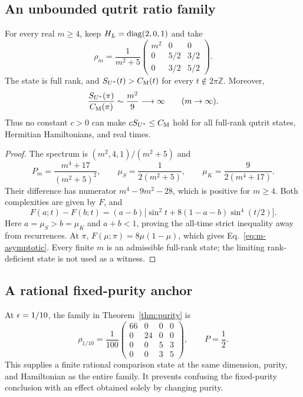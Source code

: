 \subsection{An unbounded qutrit ratio family}\label{app:unbounded-left}
\begin{proposition}\label{prop:unbounded-left}
For every real $m\ge4$, keep $H_L=\operatorname{diag}(2,0,1)$ and take
\begin{equation}\label{eq:m-family}
 \rho_m=\frac1{m^2+5}
 \begin{pmatrix}m^2&0&0\\0&5/2&3/2\\0&3/2&5/2\end{pmatrix}.
\end{equation}
The state is full rank, and $S_{U^*}(t)>C_{\mathrm M}(t)$ for every
$t\notin2\pi\mathbb Z$. Moreover,
\begin{equation}\label{eq:m-asymptotic}
 \frac{S_{U^*}(\pi)}{C_{\mathrm M}(\pi)}\sim\frac{m^2}{9}
 \longrightarrow\infty\qquad(m\to\infty).
\end{equation}
Thus no constant $c>0$ can make $cS_{U^*}\le C_{\mathrm M}$ hold for all full-rank
qutrit states, Hermitian Hamiltonians, and real times.
\end{proposition}
\begin{proof}
The spectrum is $(m^2,4,1)/(m^2+5)$ and
\begin{equation}\label{eq:m-weights}
 P_m=\frac{m^4+17}{(m^2+5)^2},\qquad
 \mu_S=\frac1{2(m^2+5)},\qquad
 \mu_K=\frac9{2(m^4+17)}.
\end{equation}
Their difference has numerator $m^4-9m^2-28$, which is positive for
$m\ge4$. Both complexities are given by $F$, and
\begin{equation}\label{eq:F-difference}
 F(a;t)-F(b;t)
 =(a-b)\bigl[\sin^2t+8(1-a-b)\sin^4(t/2)\bigr].
\end{equation}
Here $a=\mu_S>b=\mu_K$ and $a+b<1$, proving the all-time strict
inequality away from recurrences. At $\pi$, $F(\mu;\pi)=8\mu(1-\mu)$,
which gives Eq.~\eqref{eq:m-asymptotic}. Every finite $m$ is an admissible
full-rank state; the limiting rank-deficient state is not used as a witness.
\end{proof}

\subsection{A rational fixed-purity anchor}
At $\epsilon=1/10$, the family in Theorem~\ref{thm:purity} is
\begin{equation}\label{eq:purity-anchor}
 \rho_{1/10}=\frac1{100}
 \begin{pmatrix}66&0&0&0\\0&24&0&0\\0&0&5&3\\0&0&3&5\end{pmatrix},
 \qquad P=\frac12.
\end{equation}
This supplies a finite rational comparison state at the same dimension,
purity, and Hamiltonian as the entire family. It prevents confusing the
fixed-purity conclusion with an effect obtained solely by changing purity.
